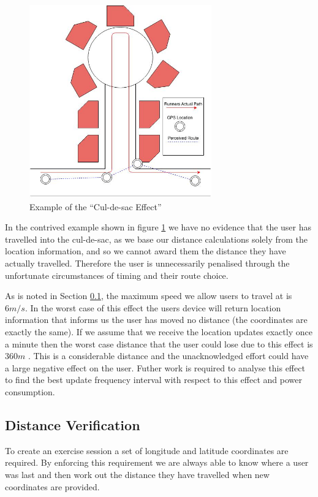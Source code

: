 \begin{figure}[h]
  \centering
  \includegraphics[width=0.7\textwidth]{images/cul-de-sac.jpg}
  \caption{Example of the ``Cul-de-sac Effect''}
  \label{fig:cul-de-sac}
\end{figure}

In the contrived example shown in figure \ref{fig:cul-de-sac} we have
no evidence that the user has travelled into the cul-de-sac, as we
base our distance calculations solely from the location information,
and so we cannot award them the distance they have actually
travelled. Therefore the user is unnecessarily penalised through the
unfortunate circumstances of timing and their route choice. 

As is noted in Section \ref{sec:distance_ver}, the maximum speed we
allow users to travel at is $\text{6}m/s$. In the worst case of this
effect the users device will return location information that informs
us the user has moved no distance (the coordinates are exactly the
same). If we assume that we receive the location updates exactly once
a minute then the worst case distance that the user could lose due to
this effect is $\text{360}m$ . This is a considerable distance and the
unacknowledged effort could have a large negative effect on the
user. Futher work is required to analyse this effect to find the best
update frequency interval with respect to this effect and power
consumption. 


\subsection{Distance Verification}
\label{sec:distance_ver}
To create an exercise session a set of longitude and latitude
coordinates are required. By enforcing this requirement we are always
able to know where a user was last and then work out the distance they
have travelled when new coordinates are provided. 

